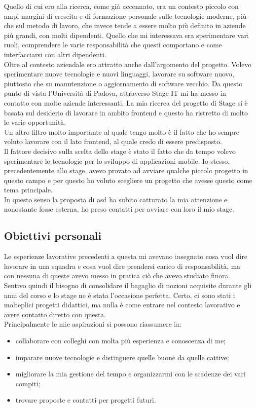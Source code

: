 Quello di cui ero alla ricerca, come già accennato, era un contesto piccolo con ampi margini di crescita e di formazione personale sulle tecnologie moderne, più che sul metodo di lavoro, che invece tende a essere molto più definito in aziende più grandi, con molti dipendenti. Quello che mi interessava era sperimentare vari ruoli, comprendere le varie responsabilità che questi comportano e come interfacciarsi con altri dipendenti. \\
Oltre al contesto aziendale ero attratto anche dall'argomento del progetto. Volevo sperimentare nuove tecnologie e nuovi linguaggi, lavorare su software nuovo, piuttosto che su manutenzione o aggiornamento di software vecchio. Da questo punto di vista l'Università di Padova, attraverso Stage-IT mi ha messo in contatto con molte aziende interessanti.
La mia ricerca del progetto di Stage si è basata sul desiderio di lavorare in ambito frontend e questo ha ristretto di molto le varie opportunità. \\
Un altro filtro molto importante al quale tengo molto è il fatto che ho sempre voluto lavorare con il lato \gls{frontend}, al quale credo di essere predisposto. \\
Il fattore decisivo sulla scelta dello stage è stato il fatto che da tempo volevo sperimentare le tecnologie per lo sviluppo di applicazioni mobile. Io stesso, precedentemente allo stage, avevo provato ad avviare qualche piccolo progetto in questo campo e per questo ho voluto scegliere un progetto che avesse questo come tema principale. \\
In questo senso la proposta di \acrlong{asd} ha subito catturato la mia attenzione e nonostante fosse esterna, ho preso contatti per avviare con loro il mio stage.

\subsection{Obiettivi personali}
\label{sec:obiettivi-pers}
Le esperienze lavorative precedenti a questa mi avevano insegnato cosa vuol dire lavorare in una squadra e cosa vuol dire prendersi carico di responsabilità, ma con nessuna di queste avevo messo in pratica ciò che avevo studiato finora. Sentivo quindi il bisogno di consolidare il bagaglio di nozioni acquisite durante gli anni del corso e lo stage ne è stata l'occasione perfetta. Certo, ci sono stati i molteplici progetti didattici, ma nulla è come entrare nel contesto lavorativo e avere contatto diretto con questa. \\
Principalmente le mie aspirazioni si possono riassumere in:
\begin{itemize}
	\item collaborare con colleghi con molta più esperienza e conoscenza di me;
	\item imparare nuove tecnologie e distinguere quelle buone da quelle cattive;
	\item migliorare la mia gestione del tempo e organizzarmi con le scadenze dei vari compiti;
	\item trovare proposte e contatti per progetti futuri.
\end{itemize}

